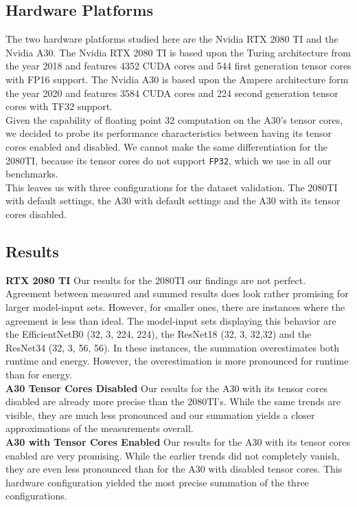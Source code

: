 \subsection{Hardware Platforms}
The two hardware platforms studied here are the Nvidia RTX 2080 TI and the Nvidia A30. The Nvidia RTX 2080 TI is based upon the Turing architecture from the year 2018 and features 4352 CUDA cores and 544 first generation tensor cores with FP16 support. The Nvidia A30 is based upon the Ampere architecture form the year 2020 and features 3584 CUDA cores and 224 second generation tensor cores with TF32 support.\\
Given the capability of floating point 32 computation on the A30's tensor cores, we decided to probe its performance characteristics between having its tensor cores enabled and disabled. We cannot make the same differentiation for the 2080TI, because its tensor cores do not support \texttt{FP32}, which we use in all our benchmarks. \\
This leaves us with three configurations for the dataset validation. The 2080TI with default settings, the A30 with default settings and the A30 with its tensor cores disabled.


\subsection{Results}

\textbf{RTX 2080 TI} Our results for the 2080TI our findings are not perfect. Agreement between measured and summed results does look rather promising for larger model-input sets. However, for smaller ones, there are instances where the agreement is less than ideal. The model-input sets displaying this behavior are the EfficientNetB0 (32, 3, 224, 224), the ResNet18 (32, 3, 32,32) and the ResNet34 (32, 3, 56, 56). In these instances, the summation overestimates both runtime and energy. However, the overestimation is more pronounced for runtime than for energy. \\
\textbf{A30 Tensor Cores Disabled} Our results for the A30 with its tensor cores disabled are already more precise than the 2080TI's. While the same trends are visible, they are much less pronounced and our summation yields a closer approximations of the measurements overall. \\
\textbf{A30 with Tensor Cores Enabled} Our results for the A30 with its tensor cores enabled are very promising. While the earlier trends did not completely vanish, they are even less pronounced than for the A30 with disabled tensor cores. This hardware configuration yielded the most precise summation of the three configurations.



